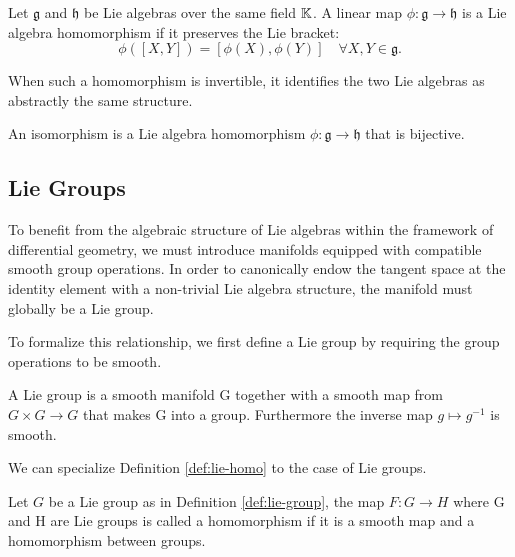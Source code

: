 \begin{definition}\label{def:lie-homo}
Let \(\mathfrak{g}\) and \(\mathfrak{h}\) be Lie algebras over the same field $\mathbb{K}$. A linear map \(\phi: \mathfrak{g} \rightarrow \mathfrak{h}\) is a Lie algebra homomorphism if it preserves the Lie bracket:
\[ 
	\phi([X, Y]) = [\phi(X), \phi(Y)] \quad \forall X, Y \in \mathfrak{g}.
\]
\end{definition}

\noindent When such a homomorphism is invertible, it identifies the two Lie algebras as abstractly the same structure.

\begin{definition}\label{def:lie-iso}
	An isomorphism is a Lie algebra homomorphism \(\phi: \mathfrak{g} \rightarrow \mathfrak{h}\) that is bijective.
\end{definition}

\subsection*{Lie Groups}
To benefit from the algebraic structure of Lie algebras within the framework of differential geometry, we must introduce manifolds equipped with compatible smooth group operations. In order to canonically endow the tangent space at the identity element with a non-trivial Lie algebra structure, the manifold must globally be a Lie group.

To formalize this relationship, we first define a Lie group by requiring the group operations to be smooth.

\begin{definition}\label{def:lie-group}
	A Lie group is a smooth manifold G together with a smooth map from $G \times G \to G$ that makes G into a group. Furthermore the inverse map $g \mapsto g^{-1}$ is smooth.
\end{definition}

\noindent We can specialize Definition \ref{def:lie-homo} to the case of Lie groups.

\begin{definition}\label{def:lie-grhomo}
	Let $G$ be a Lie group as in Definition \ref{def:lie-group}, the map $F: G \to H$ where G and H are Lie groups is called a homomorphism if it is a smooth map and a homomorphism between groups.
\end{definition}

